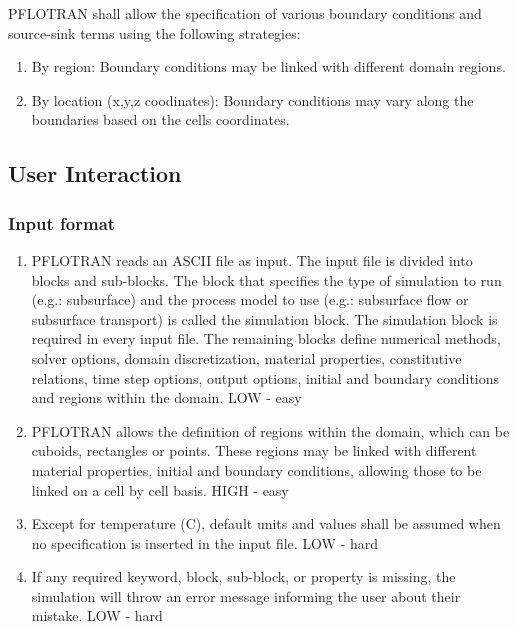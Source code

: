 PFLOTRAN shall allow the specification of various boundary conditions and source-sink terms using the following strategies:
\begin{enumerate}[label=RBC \arabic*.,ref=RBC \arabic*,nosep]
	\item By region: \label{repBCRegions} Boundary conditions may be linked with different domain regions.
	\item  By location (x,y,z coodinates): \label{repBCLocation} Boundary conditions may vary along the boundaries based on the cells coordinates.
\end{enumerate}

\subsection{User Interaction}
\subsubsection{Input format}
\begin{enumerate}[label=UI \arabic*.,ref=UI \arabic*,nosep]
	\item PFLOTRAN reads an ASCII file as input. The input file is divided into blocks and sub-blocks. The block that specifies the type of simulation to run (e.g.: subsurface) and the process model to use (e.g.: subsurface flow or subsurface transport) is called the simulation block. The simulation block is required in every input file. The remaining blocks define numerical methods, solver options, domain discretization, material properties, constitutive relations, time step options, output options, initial and boundary conditions and regions within the domain. \label{inputFile} LOW - easy
	\item PFLOTRAN allows the definition of regions within the domain, which can be cuboids, rectangles or points. These regions may be linked with different material properties, initial and boundary conditions, allowing those to be linked on a cell by cell basis. \label{inputRegions} HIGH - easy
	\item Except for temperature (C), default units and values shall be assumed when no specification is inserted in the input file. \label{inputUnitsValues} LOW - hard
	\item If any required keyword, block, sub-block, or property is missing, the simulation will throw an error message informing the user about their mistake. \label{inputErrors} LOW - hard
\end{enumerate}

